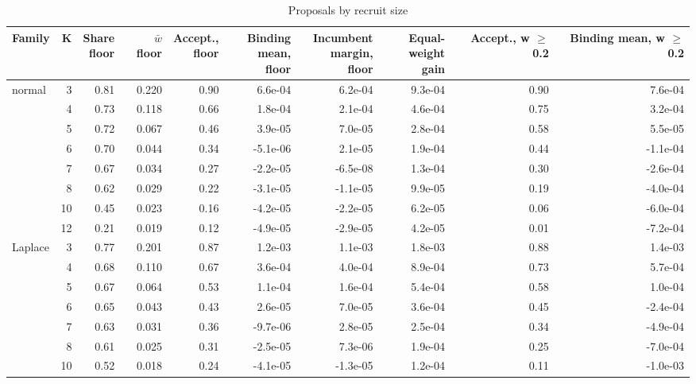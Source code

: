\begin{table}
\centering
\caption{Proposals by recruit size}
\label{tab:a6_recruit_size}
\small
\begin{tabular}{lrrrrrrrrr}
\toprule
Family & K & \makecell[b]{Share\\{}floor} & \makecell[b]{$\bar w$\\{}floor} & \makecell[b]{Accept.,\\{}floor} & \makecell[b]{Binding\\{}mean, floor} & \makecell[b]{Incumbent\\{}margin, floor} & \makecell[b]{Equal-\\{}weight gain} & \makecell[b]{Accept.,\\{}w $\geq$ 0.2} & \makecell[b]{Binding\\{}mean, w $\geq$ 0.2} \\
\midrule
normal & 3 & 0.81 & 0.220 & 0.90 & 6.6e-04 & 6.2e-04 & 9.3e-04 & 0.90 & 7.6e-04 \\
 & 4 & 0.73 & 0.118 & 0.66 & 1.8e-04 & 2.1e-04 & 4.6e-04 & 0.75 & 3.2e-04 \\
 & 5 & 0.72 & 0.067 & 0.46 & 3.9e-05 & 7.0e-05 & 2.8e-04 & 0.58 & 5.5e-05 \\
 & 6 & 0.70 & 0.044 & 0.34 & -5.1e-06 & 2.1e-05 & 1.9e-04 & 0.44 & -1.1e-04 \\
 & 7 & 0.67 & 0.034 & 0.27 & -2.2e-05 & -6.5e-08 & 1.3e-04 & 0.30 & -2.6e-04 \\
 & 8 & 0.62 & 0.029 & 0.22 & -3.1e-05 & -1.1e-05 & 9.9e-05 & 0.19 & -4.0e-04 \\
 & 10 & 0.45 & 0.023 & 0.16 & -4.2e-05 & -2.2e-05 & 6.2e-05 & 0.06 & -6.0e-04 \\
 & 12 & 0.21 & 0.019 & 0.12 & -4.9e-05 & -2.9e-05 & 4.2e-05 & 0.01 & -7.2e-04 \\
Laplace & 3 & 0.77 & 0.201 & 0.87 & 1.2e-03 & 1.1e-03 & 1.8e-03 & 0.88 & 1.4e-03 \\
 & 4 & 0.68 & 0.110 & 0.67 & 3.6e-04 & 4.0e-04 & 8.9e-04 & 0.73 & 5.7e-04 \\
 & 5 & 0.67 & 0.064 & 0.53 & 1.1e-04 & 1.6e-04 & 5.4e-04 & 0.58 & 1.0e-04 \\
 & 6 & 0.65 & 0.043 & 0.43 & 2.6e-05 & 7.0e-05 & 3.6e-04 & 0.45 & -2.4e-04 \\
 & 7 & 0.63 & 0.031 & 0.36 & -9.7e-06 & 2.8e-05 & 2.5e-04 & 0.34 & -4.9e-04 \\
 & 8 & 0.61 & 0.025 & 0.31 & -2.5e-05 & 7.3e-06 & 1.9e-04 & 0.25 & -7.0e-04 \\
 & 10 & 0.52 & 0.018 & 0.24 & -4.1e-05 & -1.3e-05 & 1.2e-04 & 0.11 & -1.0e-03 \\

\end{tabular}
\end{table}
